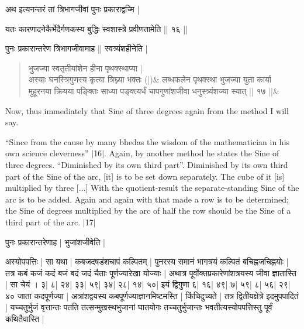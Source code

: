 \documentclass[12pt]{book}
\def\elp{$\ldots$}
\def\danda{$|$}
\begin{document}
\newpage


{\s अथ इत्यनन्तरं तां त्रिभागजीवां पुनः प्रकाराद्वच्मि |}

\vskip15pt
{\s यतः कारणादनेकैर्भेदैर्गणकस्य बुद्धिः स्वशास्त्रे प्रवीणतामेति || १६ ||}

\vskip15pt
{\s पुनः प्रकारान्तरेण त्रिभागजीवामाह || स्वत्र्यंशहीनेति |}

\vskip15pt

\begin{verse}
{\s भुजज्या स्वतृतीयांशेन हीना पृथक्स्थाप्या |\\
अस्याः घनस्त्रिगुणस्य कृत्या त्रिघ्न्या भक्तः (|)}\&
{\s लब्धफलेन पृथक्स्था भुजज्या युता
कार्या \\
मुहूरनया क्रियया पङ्क्तिः साध्या
पङ्क्त्यर्धं चापगुणांशजीवा
धनुस्त्र्यंशज्या स्यात् || १७ ||}\&
\end{verse}
\newpage


Now, thus immediately that Sine of three degrees again from the method I will say.

``Since from the cause by many bhedas the wisdom of the mathematician in 
his own science cleverness'' \danda16\danda. Again, by another method he states the Sine
of three degrees.  ``Diminished by its own third part''. 
Diminished by its own third part of the Sine
of the arc, [it] is to be set down separately.  The cube of it [is] multiplied by three [\elp]
With the quotient-result the separate-standing Sine of the arc is to be added. Again
and again with that made a row is to be determined; the Sine of degrees multiplied
by the arc of half the row should be the Sine of a third part of the arc. \danda17\danda
\newpage 




\vskip15pt
{\s पुनः प्रकारान्तरेणाह | भुजांशजीवेति |}

{\s अस्योपपत्तिः | सा यथा |
कबजदषडंशचापं कल्पितम् | 
पुनरस्य समानं भागत्रयं कल्पितं बचिह्नजचिह्नयोः |
तत्र कबं कजं कदं बजं बदं जदं चैताः
पूर्णज्यारेखा योज्याः |
अथात्र पूर्वोक्तप्रकारेणांशत्रयस्य जीवा ज्ञातास्ति | सा चेयं । 
३| ८| २४| ३३| ५९| ३४| २८| १४| ५०| इयं द्विगुणा
६| १६| ४९| ७| ५९| ८| ५६| २९| ४० जाता कदपूर्णज्या |
अत्रांशद्वयस्य कबपूर्णज्याज्ञानमिष्टमस्ति |
किंचिदुच्यते |
तत्र
द्वितीयक्षेत्रे इदमुपपादितं |
यच्चतुर्भुजं वृत्तान्तः पतति तत्सन्मुखस्थभुजानां घातयोगः
तच्चतुर्भुजान्तः
भवतीत्यस्योपपत्तिस्तु पूर्वं कथितैवास्ति |}
\end{document}
